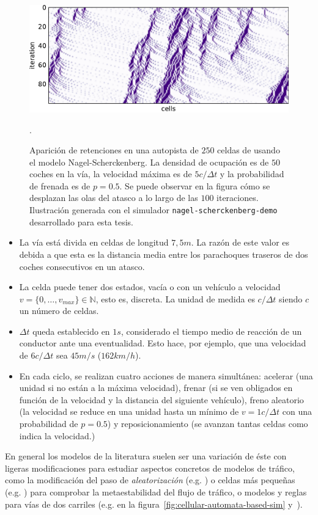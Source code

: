 \begin{figure}
	\centering
	\includegraphics{images/nagel-schreck}
	\caption{Aparición de retenciones en una autopista de $250$ celdas de usando el modelo Nagel-Scherckenberg. La densidad de ocupación es de $50$ coches en la vía, la velocidad máxima es de $5 c/\Delta t$ y la probabilidad de frenada es de $p = 0.5$. Se puede observar en la figura cómo se desplazan las olas del atasco a lo largo de las $100$ iteraciones. Ilustración generada con el simulador \texttt{nagel-scherckenberg-demo} desarrollado para esta tesis.}
	\label{fig:nagel-schreck}
.\end{figure}

\begin{itemize}
	\item La vía está divida en celdas de longitud $7,5m$. La razón de este valor es debida a que esta es la distancia media entre los parachoques traseros de dos coches consecutivos en un atasco.
	\item La celda puede tener dos estados, vacía o con un vehículo a velocidad $v = \{0, \ldots, v_{max}\} \in \mathbb{N}$, esto es, discreta. La unidad de medida es $c/\Delta t$ siendo $c$ un número de celdas.
	\item $\Delta t$ queda establecido en $1s$, considerado el tiempo medio de reacción de un conductor ante una eventualidad. Esto hace, por ejemplo, que una velocidad de $6 c/\Delta t$ sea $45 m/s$ ($162 km/h$).
	\item En cada ciclo, se realizan cuatro acciones de manera simultánea: acelerar (una unidad si no están a la máxima velocidad), frenar (si se ven obligados en función de la velocidad y la distancia del siguiente vehículo), freno aleatorio (la velocidad se reduce en una unidad hasta un mínimo de $v = 1 c/\Delta t$ con una probabilidad de $p = 0.5$) y reposicionamiento (se avanzan tantas celdas como indica la velocidad.)
\end{itemize}

En general los modelos de la literatura suelen ser una variación de éste con ligeras modificaciones para estudiar aspectos concretos de modelos de tráfico, como la modificación del paso de \textit{aleatorización} (e.g. \cite{Barlovic1998}) o celdas más pequeñas (e.g. \cite{Krauss1997}) para comprobar la metaestabilidad del flujo de tráfico, o modelos y reglas para vías de dos carriles (e.g. \cite{Brilon1999} en la figura~\ref{fig:cellular-automata-based-sim} y~\cite{Nagel1998}).

